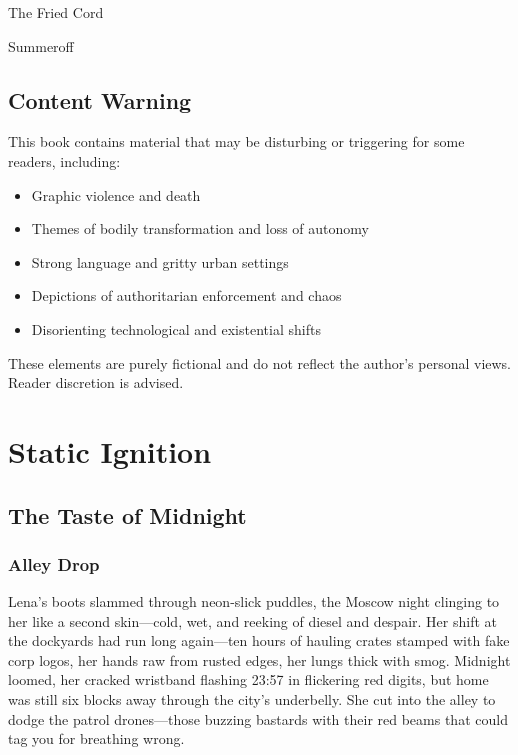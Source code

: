 \documentclass[12pt]{book}
\begin{document}
\begin{titlepage}
    \centering
    \vspace*{3cm}
    {\fontsize{48}{60}\selectfont The Fried Cord\par} %
    \vspace{2cm}
    {\Large Summeroff\par} %
\end{titlepage}
\clearpage

\chapter*{Content Warning}
This book contains material that may be disturbing or triggering for some readers, including:
\begin{itemize}
    \item Graphic violence and death
    \item Themes of bodily transformation and loss of autonomy
    \item Strong language and gritty urban settings
    \item Depictions of authoritarian enforcement and chaos
    \item Disorienting technological and existential shifts
\end{itemize}
These elements are purely fictional and do not reflect the author’s personal views. Reader discretion is advised.
\clearpage
\tableofcontents
\clearpage

\part{Static Ignition}
\chapter{The Taste of Midnight}
\section{Alley Drop}

Lena's boots slammed through neon-slick puddles, the Moscow night clinging to her like a second skin---cold, wet, and reeking of diesel and despair. Her shift at the dockyards had run long again---ten hours of hauling crates stamped with fake corp logos, her hands raw from rusted edges, her lungs thick with smog. Midnight loomed, her cracked wristband flashing 23:57 in flickering red digits, but home was still six blocks away through the city's underbelly. She cut into the alley to dodge the patrol drones---those buzzing bastards with their red beams that could tag you for breathing wrong.
\end{document}
